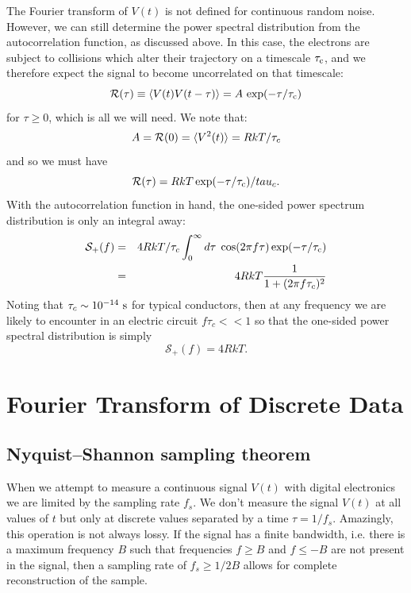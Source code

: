 \documentclass[12pt,oneside]{book}
\begin{document}
The Fourier transform of $V(t)$ is not defined for continuous random noise.  However, we can still determine the power spectral distribution from the autocorrelation function, as discussed above.  In this case, the electrons are subject to collisions which alter their trajectory on a timescale $\tau_{\rm c}$, and we therefore expect the signal to become uncorrelated on that timescale:
\begin{displaymath}
\mathcal{R}(\tau) \equiv \braket{V(t) V(t-\tau)} =  A \, \exp(-\tau/\tau_{\rm c})
\end{displaymath} 
for $\tau \geq 0$, which is all we will need.   We note that:
\begin{displaymath}
A = \mathcal{R}(0) = \braket{V^2(t)} = R kT / \tau_c
\end{displaymath}
and so we must have
\begin{displaymath}
\mathcal{R}(\tau) = RkT \exp(-\tau/\tau_{\rm c})/tau_c.
\end{displaymath} 
With the autocorrelation function in hand, the one-sided power spectrum distribution is only an integral away:
\begin{eqnarray*}
\mathcal{S}_{+}(f) &=& 4RkT/\tau_c \int_0^{\infty}d\tau \;\cos(2\pi f \tau) \exp(-\tau/\tau_{\rm c})\\
 &=& 4R kT \frac{1}{1+(2 \pi f \tau_c)^2} \\
\end{eqnarray*} 
Noting that $\tau_c \sim 10^{-14}~\rm s$ for typical conductors, then at any frequency we are likely to encounter in an electric circuit $f \tau_c << 1$ so that the one-sided power spectral distribution is simply
\begin{equation}
\mathcal{S}_{+}(f) = 4 R k T.
\end{equation}

\chapter{Fourier Transform of Discrete Data}

\section{Nyquist--Shannon sampling theorem}

When we attempt to measure a continuous signal $V(t)$ with digital electronics we are limited by the sampling rate $f_s$.  We don't measure the signal $V(t)$ at all values of $t$ but only at discrete values separated by a time $\tau =  1/f_s$.  Amazingly, this operation is not always lossy.  If the signal has a finite bandwidth, i.e. there is a maximum frequency $B$ such that frequencies $f \geq B$ and $f \leq -B$ are not present in the signal, then a sampling rate of $f_s \geq 1/2B$ allows for complete reconstruction of the sample.
\end{document}
